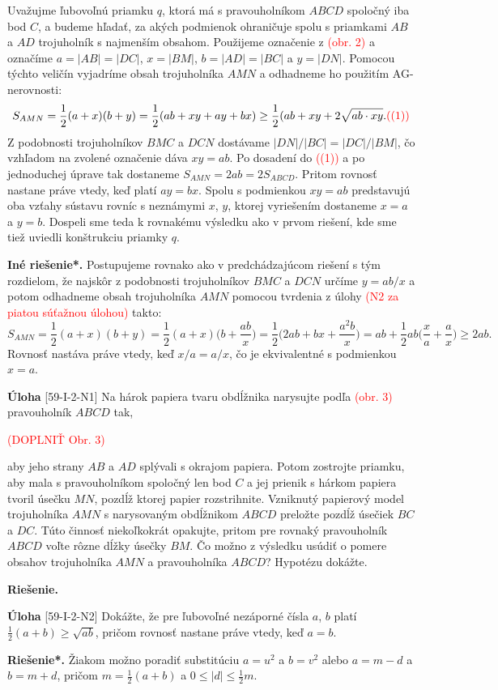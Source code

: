 \documentclass{article}
\newcommand{\rie}{\textbf{Riešenie.} }
\newcommand{\rieh}{\textbf{Riešenie*.} }
\newcommand\todo[1]{\noindent\textcolor{red}{(#1)}}
\newcommand{\problem}[3]{
  \begin{tcolorbox}[breakable,notitle,boxrule=0pt,colback=light-gray,colframe=light-gray]
    \textbf{Úloha}
    [#1] #2
  \end{tcolorbox}
  \noindent#3
}
\begin{document}
{Uvažujme ľubovoľnú priamku $q$, ktorá má s pravouholníkom $ABCD$ spoločný iba
bod $C$, a budeme hľadať, za akých podmienok ohraničuje spolu s priamkami $AB$ a $AD$
trojuholník s najmenším obsahom. Použijeme označenie z \todo{obr. 2} a označíme $a = |AB|
= |DC|$, $x = |BM|$, $b = |AD| = |BC|$ a $y = |DN|$. Pomocou týchto veličín vyjadríme
obsah trojuholníka $AMN$ a odhadneme ho použitím AG-nerovnosti:
$$S_{AMN}=\frac{1}{2}(a + x)(b + y) = \frac{1}{2}(ab + xy + ay + bx)\geq \frac{1}{2}(ab + xy + 2\sqrt{ab \cdot xy}. \todo{(1)}$$
Z podobnosti trojuholníkov $BMC$ a $DCN$ dostávame $|DN|/|BC| = |DC|/|BM|$, čo
vzhľadom na zvolené označenie dáva $xy = ab$. Po dosadení do \todo{(1)} a po jednoduchej
úprave tak dostaneme $S_{AMN} = 2ab = 2S_{ABCD}$. Pritom rovnosť nastane práve vtedy, keď platí $ay = bx$. Spolu s podmienkou $xy = ab$ predstavujú oba vzťahy sústavu rovníc s neznámymi $x$, $y$, ktorej vyriešením dostaneme $x = a$ a $y = b$. Dospeli sme teda
k rovnakému výsledku ako v prvom riešení, kde sme tiež uviedli konštrukciu priamky $q$.

\textbf{Iné riešenie*.} Postupujeme rovnako ako v predchádzajúcom riešení s tým rozdielom, že najskôr z podobnosti trojuholníkov $BMC$ a $DCN$ určíme $y = ab/x$ a potom odhadneme obsah trojuholníka $AMN$ pomocou tvrdenia z úlohy \todo{N2 za piatou súťažnou
úlohou} takto:
$$S_{AMN} =\frac{1}{2}(a + x)(b + y) =\frac{1}{2}(a + x)\bigg(b +\frac{ab}{x}\bigg)=\frac{1}{2}\bigg(2ab + bx + \frac{a^2 b}{x}\bigg)= ab +\frac{1}{2}ab\bigg(\frac{x}{a}+\frac{a}{x}\bigg)\geq 2ab.$$
Rovnosť nastáva práve vtedy, keď $x/a = a/x$, čo je ekvivalentné s podmienkou $x = a$.
}


\problem{59-I-2-N1}{
Na hárok papiera tvaru obdĺžnika narysujte podľa \todo{obr. 3} pravouholník $ABCD$ tak,

\todo{DOPLNIŤ Obr. 3}

aby jeho strany $AB$ a $AD$ splývali s okrajom papiera. Potom zostrojte priamku, aby mala s pravouholníkom spoločný len bod $C$ a jej prienik s hárkom papiera tvoril úsečku $MN$, pozdĺž ktorej papier rozstrihnite. Vzniknutý papierový model trojuholníka $AMN$ s narysovaným obdĺžnikom $ABCD$ preložte pozdĺž úsečiek $BC$ a $DC$. Túto činnosť niekoľkokrát opakujte, pritom pre rovnaký pravouholník $ABCD$ voľte rôzne dĺžky úsečky $BM$. Čo možno z výsledku usúdiť o pomere obsahov trojuholníka $AMN$ a pravouholníka $ABCD$? Hypotézu dokážte.
}{
\rie 
}

\problem{59-I-2-N2}{
Dokážte, že pre ľubovoľné nezáporné čísla $a$, $b$ platí $\frac{1}{2}(a + b) \geq \sqrt{ab}$, pričom rovnosť nastane práve vtedy, keď $a = b$.
}{
\rieh Žiakom možno poradiť substitúciu $a = u^2$ a $b = v^2$ alebo $a = m-d$ a $b = m + d$, pričom $m = \frac{1}{2}(a + b)$ a $0 \leq |d|\leq \frac{1}{2} m$.
}
\end{document}
